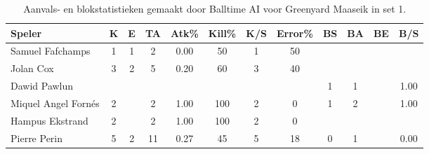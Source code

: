 \begin{table}[ht!]
  \centering
  \scriptsize
    \begin{tabular}{|l|c|c|c|c|c|c|c|c|c|c|c|} \hline
    \textbf{Speler} & K & E & TA & Atk\% & Kill\% & K/S & Error\% & BS & BA & BE & B/S \\ \hline
    Samuel Fafchamps & 1 & 1 & 2 & 0.00 & 50 & 1 & 50 &  &  &  & \\
    Jolan Cox & 3 & 2 & 5 & 0.20 & 60 & 3 & 40 &   &  &  &  \\
    Dawid Pawlun &   &   &   &   &   &   &   & 1 & 1 & & 1.00\\
    Miquel Angel Fornés & 2 &  & 2 & 1.00 & 100 & 2 & 0 & 1 & 2 & & 1.00\\
    Hampus Ekstrand & 2 &  & 2 & 1.00 & 100 & 2 & 0 &  & & & \\
    Pierre Perin & 5 & 2 & 11 & 0.27 & 45 & 5 & 18 & 0 & 1 &  & 0.00\\ \hline
  \end{tabular}
  \caption[Aanvals- en blokstatistieken gemaakt door Balltime AI voor Greenyard Maaseik in set 1]{\label{tab:PL3AttBlockMaaseik1}Aanvals- en blokstatistieken gemaakt door Balltime AI voor Greenyard Maaseik in set 1.}
\end{table}
    